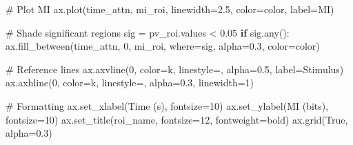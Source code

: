 \documentclass[
  11pt,
  letterpaper,
  oneside,
  openany]{book}
\newenvironment{Shaded}{\begin{snugshade}}{\end{snugshade}}
\newcommand{\BuiltInTok}[1]{\textcolor[rgb]{0.00,0.23,0.31}{#1}}
\newcommand{\CommentTok}[1]{\textcolor[rgb]{0.37,0.37,0.37}{#1}}
\newcommand{\ControlFlowTok}[1]{\textcolor[rgb]{0.00,0.23,0.31}{\textbf{#1}}}
\newcommand{\DecValTok}[1]{\textcolor[rgb]{0.68,0.00,0.00}{#1}}
\newcommand{\FloatTok}[1]{\textcolor[rgb]{0.68,0.00,0.00}{#1}}
\newcommand{\NormalTok}[1]{\textcolor[rgb]{0.00,0.23,0.31}{#1}}
\newcommand{\OperatorTok}[1]{\textcolor[rgb]{0.37,0.37,0.37}{#1}}
\newcommand{\StringTok}[1]{\textcolor[rgb]{0.13,0.47,0.30}{#1}}
\newcommand{\VariableTok}[1]{\textcolor[rgb]{0.07,0.07,0.07}{#1}}
\begin{document}
\begin{Shaded}
\begin{Highlighting}[]
    \CommentTok{\# Plot MI}
\NormalTok{    ax.plot(time\_attn, mi\_roi, linewidth}\OperatorTok{=}\FloatTok{2.5}\NormalTok{, color}\OperatorTok{=}\NormalTok{color, label}\OperatorTok{=}\StringTok{\textquotesingle{}MI\textquotesingle{}}\NormalTok{)}
    
    \CommentTok{\# Shade significant regions}
\NormalTok{    sig }\OperatorTok{=}\NormalTok{ pv\_roi.values }\OperatorTok{\textless{}} \FloatTok{0.05}
    \ControlFlowTok{if}\NormalTok{ sig.}\BuiltInTok{any}\NormalTok{():}
\NormalTok{        ax.fill\_between(time\_attn, }\DecValTok{0}\NormalTok{, mi\_roi, where}\OperatorTok{=}\NormalTok{sig, alpha}\OperatorTok{=}\FloatTok{0.3}\NormalTok{, color}\OperatorTok{=}\NormalTok{color)}
    
    \CommentTok{\# Reference lines}
\NormalTok{    ax.axvline(}\DecValTok{0}\NormalTok{, color}\OperatorTok{=}\StringTok{\textquotesingle{}k\textquotesingle{}}\NormalTok{, linestyle}\OperatorTok{=}\StringTok{\textquotesingle{}{-}{-}\textquotesingle{}}\NormalTok{, alpha}\OperatorTok{=}\FloatTok{0.5}\NormalTok{, label}\OperatorTok{=}\StringTok{\textquotesingle{}Stimulus\textquotesingle{}}\NormalTok{)}
\NormalTok{    ax.axhline(}\DecValTok{0}\NormalTok{, color}\OperatorTok{=}\StringTok{\textquotesingle{}k\textquotesingle{}}\NormalTok{, linestyle}\OperatorTok{=}\StringTok{\textquotesingle{}{-}\textquotesingle{}}\NormalTok{, alpha}\OperatorTok{=}\FloatTok{0.3}\NormalTok{, linewidth}\OperatorTok{=}\DecValTok{1}\NormalTok{)}
    
    \CommentTok{\# Formatting}
\NormalTok{    ax.set\_xlabel(}\StringTok{\textquotesingle{}Time (s)\textquotesingle{}}\NormalTok{, fontsize}\OperatorTok{=}\DecValTok{10}\NormalTok{)}
\NormalTok{    ax.set\_ylabel(}\StringTok{\textquotesingle{}MI (bits)\textquotesingle{}}\NormalTok{, fontsize}\OperatorTok{=}\DecValTok{10}\NormalTok{)}
\NormalTok{    ax.set\_title(roi\_name, fontsize}\OperatorTok{=}\DecValTok{12}\NormalTok{, fontweight}\OperatorTok{=}\StringTok{\textquotesingle{}bold\textquotesingle{}}\NormalTok{)}
\NormalTok{    ax.grid(}\VariableTok{True}\NormalTok{, alpha}\OperatorTok{=}\FloatTok{0.3}\NormalTok{)}
    

\end{Highlighting}
\end{Shaded}
\end{document}
